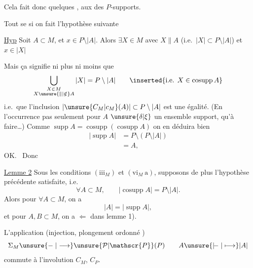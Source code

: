 Cela fait donc quelques ,  aux  des  $P$-supports.

Tout  se  si on fait l'hypothèse suivante

\uline{Hyp} Soit $A\subset M$, et $x\in P\setminus|A|$. Alors $\exists X\in M$ avec  $X\parallel A$ (i.e.\ $|X|\subset P\setminus|A|$) et $x\in|X|$

Mais ça signifie ni plus ni moins que
\[
\bigcup_{\substack{X\in M\\X\unsure{\parallel|\notin}A}}|X|=P\setminus|A|
\qquad\inserted{\text{i.e. }X\in\operatorname{cosupp}A}
\]
i.e.\ que l'inclusion $|\unsure{C_M|c_M}(A)|\subset P\setminus|A|$ est une égalité. (En l'occurrence pas seulement pour $A$ $\unsure{\delta|\xi}$ un ensemble support,  qu'à faire\ldots) Comme $\operatorname{supp}A=\operatorname{cosupp}(\operatorname{cosupp}A)$ on en déduira bien
\[
\begin{aligned}
|\operatorname{supp}A|&=P\setminus(P\setminus|A|)\\
&=A,
\end{aligned}
\]
OK.\  Donc

\uline{Lemme 2} Sous les conditions $(\mathrm{iii}_M)$ et $(\mathrm{vi}_M\ \text{a})$, supposons de plus l'hypothèse précédente satisfaite, i.e.
\[
\forall A\subset M,\qquad |\operatorname{cosupp}A|=P\setminus|A|.
\]
Alors pour $\forall A\subset M$, on a
\[
|A|=|\operatorname{supp}A|,
\]
et pour $A,B\subset M$, on a
 $\Longleftarrow$  dans lemme 1).

L'application (injection, plongement ordonné )
\[
\Sigma_M\unsure{\mathrel{-}|\longrightarrow}\unsure{\mathcal{P}|\mathscr{P}}(P)
\qquad A\unsure{\mathrel{\vert\!{-}}|\longmapsto}|A|
\]
commute à l'involution $C_M$, $C_P$.
